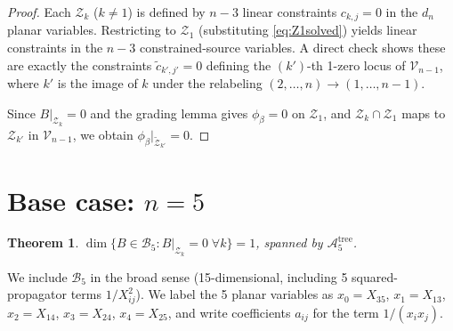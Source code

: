 \documentclass[11pt]{article}
\theoremstyle{plain}
\newtheorem{theorem}{Theorem}[section]
\theoremstyle{definition}
\newcommand{\cA}{\mathcal{A}}
\newcommand{\cB}{\mathcal{B}}
\newcommand{\cV}{\mathcal{V}}
\newcommand{\cZ}{\mathcal{Z}}
\begin{document}
\begin{proof}
Each $\cZ_k$ ($k\neq 1$) is defined by $n{-}3$ linear constraints
$c_{k,j}=0$ in the $d_n$ planar variables. Restricting to $\cZ_1$
(substituting \eqref{eq:Z1solved}) yields linear constraints in
the $n{-}3$ constrained-source variables. A direct check shows
these are exactly the constraints $\widetilde{c}_{k',j'}=0$ defining
the $(k')$-th 1-zero locus of $\cV_{n-1}$, where $k'$ is the
image of $k$ under the relabeling $(2,\ldots,n)\to(1,\ldots,n{-}1)$.

Since $B|_{\cZ_k}=0$ and the grading lemma gives $\phi_\beta = 0$
on $\cZ_1$, and $\cZ_k\cap\cZ_1$ maps to $\cZ_{k'}$ in
$\cV_{n-1}$, we obtain $\phi_\beta|_{\widetilde{\cZ}_{k'}}=0$.
\end{proof}

\section{Base case: $n=5$}
\label{sec:n5}

\begin{theorem}\label{thm:n5}
$\dim\{B\in\cB_5 : B|_{\cZ_k}=0\;\forall k\} = 1$, spanned by
$\cA_5^{\mathrm{tree}}$.
\end{theorem}

We include $\cB_5$ in the broad sense (15-dimensional, including
5 squared-propagator terms $1/X_{ij}^2$). We label the 5 planar
variables as $x_0=X_{35}$, $x_1=X_{13}$, $x_2=X_{14}$, $x_3=X_{24}$,
$x_4=X_{25}$, and write coefficients $a_{ij}$ for the term $1/(x_i x_j)$.
\end{document}
